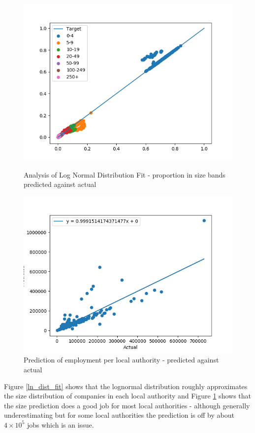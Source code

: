 \documentclass[a4paper,10pt]{article}
\begin{document}
\begin{figure}
 \includegraphics[width=\textwidth]{graphics/proportions_local_units}
 \caption{Analysis of Log Normal Distribution Fit - proportion in size bands predicted against actual}
 \label{ln_dist_fit}
 \includegraphics[width=\textwidth]{graphics/LA_employment_pred_locl_units}
 \caption{Prediction of employment per local authority - predicted against actual}
 \label{size_pred}
\end{figure}

Figure \ref{ln_dist_fit} shows that the lognormal distribution roughly approximates the size distribution of companies in each local authority and Figure \ref{size_pred} shows that the size prediction does a good job for most local authorities - although generally underestimating but for some local authorities the prediction is off by about $4 \times 10^5$ jobs which is an issue.
\end{document}
